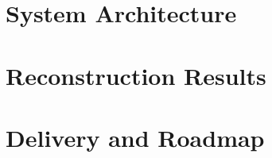 \documentclass[a4paper,11pt,twoside,openright]{report}
\begin{document}
\part{System Architecture}
\label{part:architecture}






\cleardoublepage
\part{Reconstruction Results}
\label{part:results}





\cleardoublepage
\part{Delivery and Roadmap}
\label{part:delivery}




\cleardoublepage
\printbibliography[heading=bibintoc, title={References}]

\printindex
\end{document}
